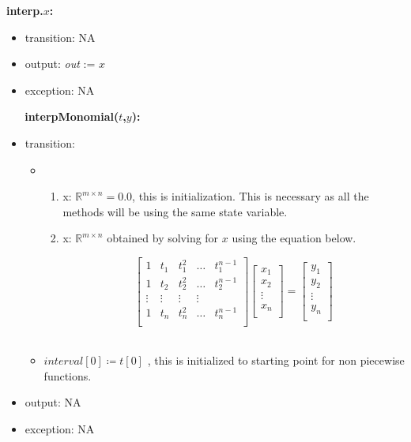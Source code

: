 \documentclass[12pt, titlepage]{article}
\begin{document}
\noindent \textbf{interp.$x$:}
\begin{itemize}
	\item transition: NA	
	\item output: \textit{out} := $x$
	\item exception: NA
\end{itemize}
~\newline
~\newline
\noindent \textbf{interpMonomial($t$,$y$):}
\begin{itemize}
\item transition: 
\begin{itemize}
	\item 
	\begin{enumerate}
	\item x: $\mathbb{R}^{m \times n} = 0.0 $, this is initialization. This is 
	necessary as all the methods will be using the same state variable.
	
	\item x: $\mathbb{R}^{m \times n}$ obtained by solving for $x$ using the 
	equation below.
	
	\begin{equation*}
	\begin{bmatrix}
	1 & t_{1} & t_{1} ^2 & \dots & t_{1} ^{n-1} \\
	1 & t_{2} & t_{2} ^2 & \dots & t_{2} ^{n-1} \\
	\vdots & \vdots & \vdots & \vdots \\
	1 & t_{n} & t_{n} ^2 & \dots & t_{n} ^{n-1} \\
	\end{bmatrix}
	\begin{bmatrix}
	x_1  \\
	x_2 \\
	\vdots \\
	x_n \\
	\end{bmatrix} = 
	\begin{bmatrix}
	y_1  \\
	y_2 \\
	\vdots \\
	y_n \\
	\end{bmatrix}
	\end{equation*}\\
	\end{enumerate}
	\item $interval[0] \coloneqq t[0] $ , this is initialized to 
	starting point for non piecewise functions.
\end{itemize}
  
\item output: NA
 
\item exception: NA
\end{itemize}
\end{document}
